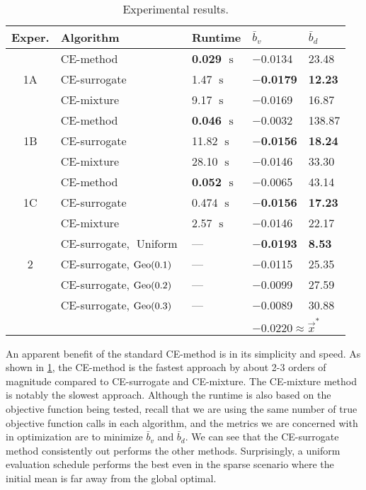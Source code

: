 \begin{table}[!ht]
    \centering
    \caption{\label{tab:cem_results} Experimental results.}
    \begin{tabular}{cllll} %
    \toprule
    \textbf{Exper.} & \textbf{Algorithm} & \textbf{Runtime} & $\bar{b}_v$ & $\bar{b}_d$\\
    \midrule
    \multirow{3}{*}{1A} & CE-method & \textbf{0.029 $\operatorname{s}$} & $-$0.0134 & 23.48\\
    &CE-surrogate & 1.47 $\operatorname{s}$ & \textbf{\boldmath$-$0.0179} & \textbf{12.23}\\
    &CE-mixture & 9.17 $\operatorname{s}$ & $-$0.0169 & 16.87\\
    \midrule
    \multirow{3}{*}{1B} & CE-method & \textbf{0.046 $\operatorname{s}$} & $-$0.0032 & 138.87\\
    &CE-surrogate & 11.82 $\operatorname{s}$ & \textbf{\boldmath$-$0.0156} & \textbf{18.24}\\
    &CE-mixture & 28.10 $\operatorname{s}$ & $-$0.0146 & 33.30\\
    \midrule
    \multirow{3}{*}{1C} & CE-method & \textbf{0.052 $\operatorname{s}$} & $-$0.0065 & 43.14\\
    &CE-surrogate & 0.474 $\operatorname{s}$ & \textbf{\boldmath$-$0.0156} & \textbf{17.23}\\
    &CE-mixture & 2.57 $\operatorname{s}$ & $-$0.0146 & 22.17\\
    \midrule
    \multirow{3}{*}{2} & CE-surrogate, $\operatorname{Uniform}$ & --- & \textbf{\boldmath$-$0.0193} & \textbf{8.53}\\
    &CE-surrogate, $\operatorname{Geo}(0.1)$ & {\color{gray}---} & $-$0.0115 & 25.35\\
    &CE-surrogate, $\operatorname{Geo}(0.2)$ & {\color{gray}---} & $-$0.0099 & 27.59\\
    &CE-surrogate, $\operatorname{Geo}(0.3)$ & {\color{gray}---} & $-$0.0089 & 30.88\\
    \bottomrule
    & & & \multicolumn{2}{l}{$-\text{0.0220} \approx\vec{x}^*$}\\
    \end{tabular}
\end{table}

An apparent benefit of the standard CE-method is in its simplicity and speed.
As shown in \cref{tab:cem_results}, the CE-method is the fastest approach by about 2-3 orders of magnitude compared to CE-surrogate and CE-mixture.
The CE-mixture method is notably the slowest approach.
Although the runtime is also based on the objective function being tested, recall that we are using the same number of true objective function calls in each algorithm, and the metrics we are concerned with in optimization are to minimize $\bar{b}_v$ and $\bar{b}_d$.
We can see that the CE-surrogate method consistently out performs the other methods.
Surprisingly, a uniform evaluation schedule performs the best even in the sparse scenario where the initial mean is far away from the global optimal.

